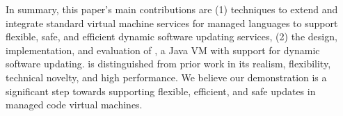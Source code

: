 In summary, this paper's main contributions are (1) techniques to extend and
integrate standard virtual machine services for managed languages to
support flexible, safe, and efficient dynamic software updating
services, (2) the design, implementation, and evaluation of \DSU, a
Java VM with support for dynamic software updating. \DSU{} is
distinguished from prior work in its realism, flexibility, technical
novelty, and high performance.  We believe our demonstration is a
significant step towards supporting flexible, efficient, and safe
updates in managed code virtual machines.

